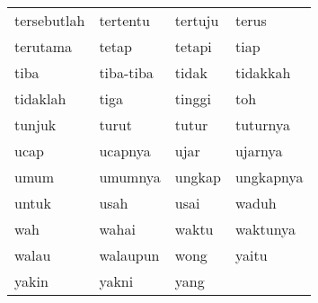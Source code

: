 \begin{tabular}{ | l | l | l | l | }
tersebutlah & tertentu & tertuju & terus\\
terutama & tetap & tetapi & tiap\\
tiba & tiba-tiba & tidak & tidakkah\\
tidaklah & tiga & tinggi & toh\\
tunjuk & turut & tutur & tuturnya\\
ucap & ucapnya & ujar & ujarnya\\
umum & umumnya & ungkap & ungkapnya\\
untuk & usah & usai & waduh\\
wah & wahai & waktu & waktunya\\
walau & walaupun & wong & yaitu\\
yakin & yakni & yang & 

\end{tabular} 

